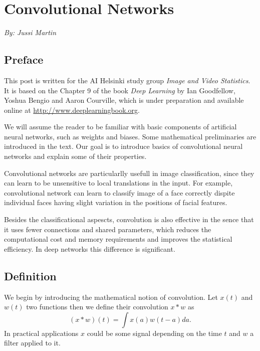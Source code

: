 \documentclass[]{article}
\begin{document}
\section{Convolutional Networks}
\begin{center}
  \emph{By: Jussi Martin}
\end{center}
\subsection{Preface}
This post is written for the AI Helsinki study group \emph{Image and Video Statistics}.
It is based on the Chapter 9 of the book \emph{Deep Learning} by Ian Goodfellow,
Yoshua Bengio and Aaron Courville, which is under preparation and available
online at \url{http://www.deeplearningbook.org}.

We will assume the reader to be familiar with basic components of artificial
neural networks, such as weights and biases. Some mathematical preliminaries are
introduced in the text. Our goal is to introduce basics of convolutional neural
networks and explain some of their properties.

Convolutional networks are particularlly usefull in image classification, since
they can learn to be unsensitive to local translations in the input. For example,
convolutional network can learn to classify image of a face correctly dispite
individual faces having slight variation in the positions of facial features.

Besides the classificational aspescts, convolution is also effective in the sence
that it uses fewer connections and shared parameters, which reduces the
computational cost and memory requirements and improves the statistical efficiency.
In deep networks this difference is significant.



\subsection{Definition}
We begin by introducing the mathematical notion of convolution. Let $x(t)$ and $w(t)$
two functions then we define their convolution $x * w$ as
\[
(x * w)(t) = \int x(a)w(t - a)da.
\]
In practical applications $x$ could be some signal depending on the time $t$ and
$w$ a filter applied to it.
\end{document}
